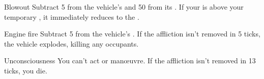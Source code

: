 
\begin{describe}{Blowout}
  Subtract 5 from the vehicle's  and 50 from its . If your  is above your temporary , it immediately reduces to the .
\end{describe}

\begin{describe}{Engine fire}
  Subtract 5 from the vehicle's . If the affliction isn't removed in 5 ticks, the vehicle explodes, killing any occupants.
\end{describe}

\begin{describe}{Unconsciousness}
  You can't act or man\oe{}uvre. If the affliction isn't removed in 13 ticks, you die.
\end{describe}
